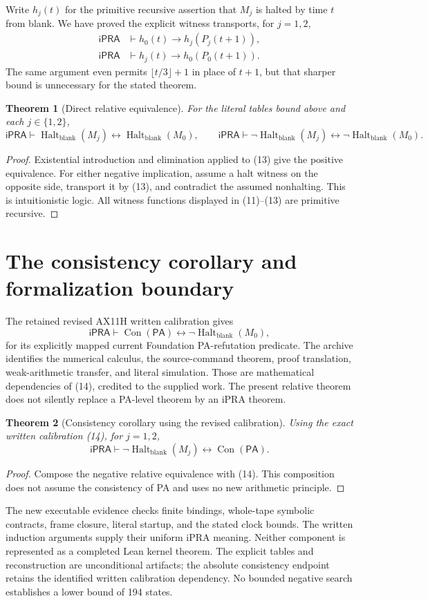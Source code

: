 \documentclass[11pt]{article}
\newtheorem{theorem}{Theorem}
\newcommand{\ipra}{\mathsf{iPRA}}
\newcommand{\Halt}{\operatorname{Halt}_{\mathrm{blank}}}
\begin{document}
Write $h_j(t)$ for the primitive recursive assertion that $M_j$ is
halted by time $t$ from blank. We have proved the explicit witness
transports, for $j=1,2$,
\begin{align*}
 \ipra&\vdash h_0(t)\longrightarrow h_j(P_j(t+1)),\\
 \ipra&\vdash h_j(t)\longrightarrow h_0(P_0(t+1)).        \tag{13}
\end{align*}
The same argument even permits $\lfloor t/3\rfloor+1$ in place of
$t+1$, but that sharper bound is unnecessary for the stated theorem.

\begin{theorem}[Direct relative equivalence]
For the literal tables bound above and each $j\in\{1,2\}$,
\[
 \ipra\vdash\Halt(M_j)\leftrightarrow\Halt(M_0),
 \qquad
 \ipra\vdash\neg\Halt(M_j)\leftrightarrow\neg\Halt(M_0).
\]
\end{theorem}
\begin{proof}
Existential introduction and elimination applied to (13) give the
positive equivalence. For either negative implication, assume a halt
witness on the opposite side, transport it by (13), and contradict the
assumed nonhalting. This is intuitionistic logic. All witness functions
displayed in (11)--(13) are primitive recursive.
\end{proof}

\section{The consistency corollary and formalization boundary}

The retained revised AX11H written calibration gives
\[
 \ipra\vdash\operatorname{Con}(\mathsf{PA})
              \leftrightarrow\neg\Halt(M_0),             \tag{14}
\]
for its explicitly mapped current Foundation PA-refutation predicate.
The archive identifies the numerical calculus, the source-command
theorem, proof translation, weak-arithmetic transfer, and literal
simulation. Those are mathematical dependencies of (14), credited
to the supplied work. The present relative theorem does not silently
replace a PA-level theorem by an iPRA theorem.

\begin{theorem}[Consistency corollary using the revised calibration]
Using the exact written calibration (14), for $j=1,2$,
\[
 \boxed{\ipra\vdash\neg\Halt(M_j)
                       \leftrightarrow\operatorname{Con}(\mathsf{PA}).}
\]
\end{theorem}
\begin{proof}
Compose the negative relative equivalence with (14). This composition
does not assume the consistency of PA and uses no new arithmetic
principle.
\end{proof}

The new executable evidence checks finite bindings, whole-tape symbolic
contracts, frame closure, literal startup, and the stated clock bounds.
The written induction arguments supply their uniform iPRA meaning.
Neither component is represented as a completed Lean kernel theorem.
The explicit tables and reconstruction are unconditional artifacts;
the absolute consistency endpoint retains the identified written
calibration dependency. No bounded negative search establishes a
lower bound of 194 states.
\end{document}
